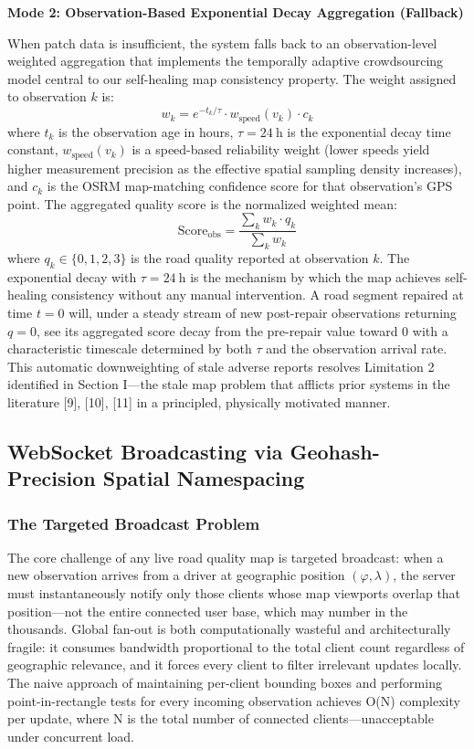 \documentclass[conference]{IEEEtran}
\begin{document}
\textbf{Mode 2: Observation-Based Exponential Decay Aggregation (Fallback)}

When patch data is insufficient, the system falls back to an observation-level weighted aggregation that implements the temporally adaptive crowdsourcing model central to our self-healing map consistency property.
The weight assigned to observation $k$ is:
\begin{equation}
w_k = e^{-t_k/\tau} \cdot w_{\text{speed}}(v_k) \cdot c_k
\end{equation}
where $t_k$ is the observation age in hours, $\tau = 24~\text{h}$ is the exponential decay time constant, $w_{\text{speed}}(v_k)$ is a speed-based reliability weight (lower speeds yield higher measurement precision as the effective spatial sampling density increases), and $c_k$ is the OSRM map-matching confidence score for that observation's GPS point.
The aggregated quality score is the normalized weighted mean:
\begin{equation}
\text{Score}_{\text{obs}} = \frac{\sum_k w_k \cdot q_k}{\sum_k w_k}
\end{equation}
where $q_k \in \{0, 1, 2, 3\}$ is the road quality reported at observation $k$.
The exponential decay with $\tau = 24~\text{h}$ is the mechanism by which the map achieves self-healing consistency without any manual intervention.
A road segment repaired at time $t=0$ will, under a steady stream of new post-repair observations returning $q = 0$, see its aggregated score decay from the pre-repair value toward 0 with a characteristic timescale determined by both $\tau$ and the observation arrival rate.
This automatic downweighting of stale adverse reports resolves Limitation 2 identified in Section I---the stale map problem that afflicts prior systems in the literature [9], [10], [11] in a principled, physically motivated manner.

\subsection{WebSocket Broadcasting via Geohash-Precision Spatial Namespacing}

\subsubsection{The Targeted Broadcast Problem}
The core challenge of any live road quality map is targeted broadcast: when a new observation arrives from a driver at geographic position $(\varphi, \lambda)$, the server must instantaneously notify only those clients whose map viewports overlap that position---not the entire connected user base, which may number in the thousands.
Global fan-out is both computationally wasteful and architecturally fragile: it consumes bandwidth proportional to the total client count regardless of geographic relevance, and it forces every client to filter irrelevant updates locally.
The naive approach of maintaining per-client bounding boxes and performing point-in-rectangle tests for every incoming observation achieves O(N) complexity per update, where N is the total number of connected clients---unacceptable under concurrent load.
\end{document}
